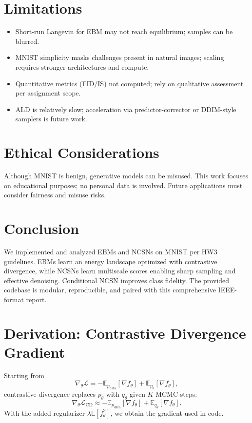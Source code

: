 \documentclass[conference]{IEEEtran}
\begin{document}
\section{Limitations}
\begin{itemize}[leftmargin=*]
    \item Short-run Langevin for EBM may not reach equilibrium; samples can be blurred.
    \item MNIST simplicity masks challenges present in natural images; scaling requires stronger architectures and compute.
    \item Quantitative metrics (FID/IS) not computed; rely on qualitative assessment per assignment scope.
    \item ALD is relatively slow; acceleration via predictor-corrector or DDIM-style samplers is future work.
\end{itemize}

\section{Ethical Considerations}
Although MNIST is benign, generative models can be misused. This work focuses on educational purposes; no personal data is involved. Future applications must consider fairness and misuse risks.

\section{Conclusion}
We implemented and analyzed EBMs and NCSNs on MNIST per HW3 guidelines. EBMs learn an energy landscape optimized with contrastive divergence, while NCSNs learn multiscale scores enabling sharp sampling and effective denoising. Conditional NCSN improves class fidelity. The provided codebase is modular, reproducible, and paired with this comprehensive IEEE-format report.

\appendices

\section{Derivation: Contrastive Divergence Gradient}
Starting from
\begin{equation}
    \nabla_\theta \mathcal{L} = - \mathbb{E}_{p_{\text{data}}}[\nabla f_\theta] + \mathbb{E}_{p_\theta}[\nabla f_\theta],
\end{equation}
contrastive divergence replaces $p_\theta$ with $q_\theta$ given $K$ MCMC steps:
\begin{equation}
    \nabla_\theta \mathcal{L}_{\text{CD}} \approx - \mathbb{E}_{p_{\text{data}}}[\nabla f_\theta] + \mathbb{E}_{q_\theta}[\nabla f_\theta].
\end{equation}
With the added regularizer $\lambda \mathbb{E}[f_\theta^2]$, we obtain the gradient used in code.
\end{document}
